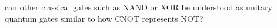 \documentclass[preview]{standalone}
\begin{document}
\begin{center}
can other classical gates such as NAND or XOR be understood as unitary quantum gates similar to how CNOT represents NOT?
\end{center}
\end{document}
